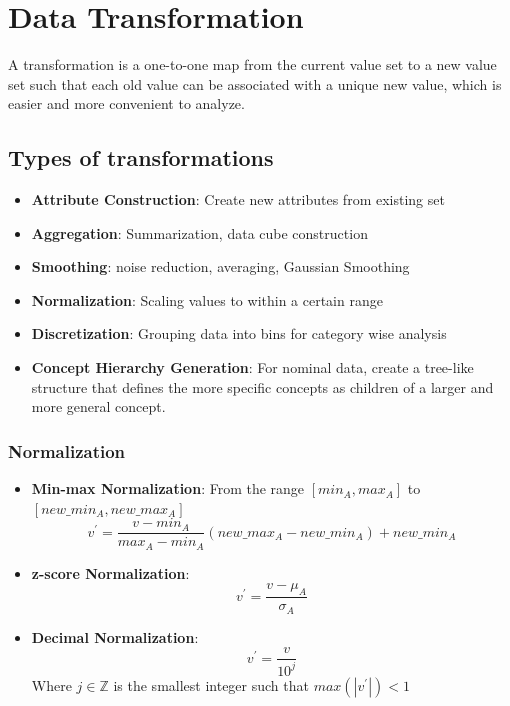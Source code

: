\documentclass{article}
\theoremstyle{plain}
\theoremstyle{definition}
\begin{document}
\section{Data Transformation}
A transformation is a one-to-one map from the current value set to a new value set such that each old value can be associated with a unique new value, which is easier and more convenient to analyze. 
\subsection{Types of transformations}
\begin{itemize}
    \item \textbf{Attribute Construction}: Create new attributes from existing set
    
    \item \textbf{Aggregation}: Summarization, data cube construction
    
    \item \textbf{Smoothing}: noise reduction, averaging, Gaussian Smoothing
    
    \item \textbf{Normalization}: Scaling values to within a certain range
    
    \item \textbf{Discretization}: Grouping data into bins for category wise analysis
    
    \item \textbf{Concept Hierarchy Generation}: For nominal data, create a tree-like structure that defines the more specific concepts as children of a larger and more general concept. 
\end{itemize}

\subsubsection{Normalization}
\begin{itemize}
    \item \textbf{Min-max Normalization}: From the range $[min_A, max_A]$ to $[new\_min_A, new\_max_A]$
    \begin{equation}
        v^\prime  = \frac{v - min_A}{max_A - min_A}(new\_max_A - new\_min_A) + new\_min_A
    \end{equation}
    
    \item \textbf{z-score Normalization}: 
    \begin{equation}
        v^\prime = \frac{v - \mu_A}{\sigma_A}
    \end{equation}
    
    \item \textbf{Decimal Normalization}: 
    \begin{equation}
        v^\prime = \frac{v}{10^j}
    \end{equation}
    Where $j \in \mathbb{Z}$ is the smallest integer such that $max(\left | v^\prime \right|) < 1$
\end{itemize}
\end{document}
